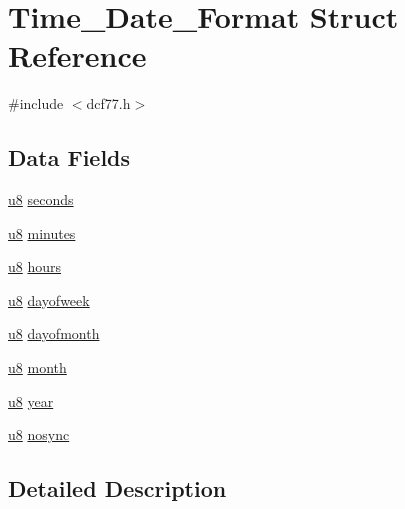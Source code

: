 \hypertarget{struct_time___date___format}{\section{Time\-\_\-\-Date\-\_\-\-Format Struct Reference}
\label{struct_time___date___format}
}


{\ttfamily \#include $<$dcf77.\-h$>$}

\subsection*{Data Fields}
\begin{DoxyCompactItemize}
\item 
\hyperlink{p8_2pinguino_2core_2typedef_8h_aed742c436da53c1080638ce6ef7d13de}{u8} \hyperlink{struct_time___date___format_ae53e173daf8fcf970bb3324ae545f21c}{seconds}
\item 
\hyperlink{p8_2pinguino_2core_2typedef_8h_aed742c436da53c1080638ce6ef7d13de}{u8} \hyperlink{struct_time___date___format_a517646d9969ae9c9f8921e133b1b872b}{minutes}
\item 
\hyperlink{p8_2pinguino_2core_2typedef_8h_aed742c436da53c1080638ce6ef7d13de}{u8} \hyperlink{struct_time___date___format_af8ebb6bc008ed8d3be395faf75ec1ebc}{hours}
\item 
\hyperlink{p8_2pinguino_2core_2typedef_8h_aed742c436da53c1080638ce6ef7d13de}{u8} \hyperlink{struct_time___date___format_a97419c23eb9097f89c83ce342df499f8}{dayofweek}
\item 
\hyperlink{p8_2pinguino_2core_2typedef_8h_aed742c436da53c1080638ce6ef7d13de}{u8} \hyperlink{struct_time___date___format_af980355fa766196214d34395ebed0a89}{dayofmonth}
\item 
\hyperlink{p8_2pinguino_2core_2typedef_8h_aed742c436da53c1080638ce6ef7d13de}{u8} \hyperlink{struct_time___date___format_ad5f8cd6773aef677b920ae4e4265bb10}{month}
\item 
\hyperlink{p8_2pinguino_2core_2typedef_8h_aed742c436da53c1080638ce6ef7d13de}{u8} \hyperlink{struct_time___date___format_ab02bacda75d48acac498f0c9f4e9b1cf}{year}
\item 
\hyperlink{p8_2pinguino_2core_2typedef_8h_aed742c436da53c1080638ce6ef7d13de}{u8} \hyperlink{struct_time___date___format_aa1bb3da10a284c040c7fcf3943b36d58}{nosync}
\end{DoxyCompactItemize}


\subsection{Detailed Description}


